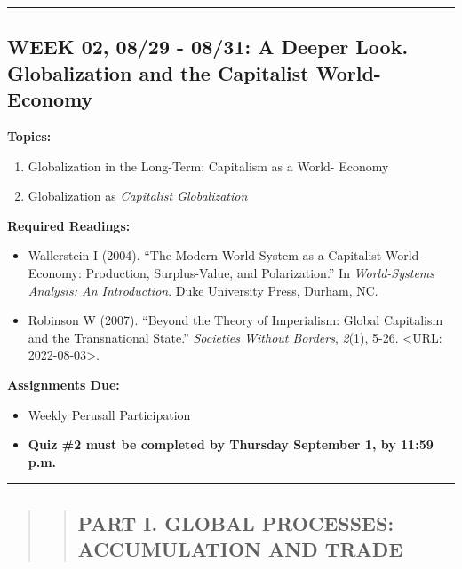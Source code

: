 \documentclass[11pt,]{article}
\providecommand{\tightlist}{%
  \setlength{\itemsep}{0pt}\setlength{\parskip}{0pt}}
\begin{document}
\bigbreak
\hrule
\newpage

\hypertarget{week-02-0829---0831-a-deeper-look.-globalization-and-the-capitalist-world-economy}{%
\subsection{WEEK 02, 08/29 - 08/31: A Deeper Look. Globalization and the
Capitalist
World-Economy}\label{week-02-0829---0831-a-deeper-look.-globalization-and-the-capitalist-world-economy}}

\textbf{Topics:}

\begin{enumerate}
\def\labelenumi{(\arabic{enumi})}
\tightlist
\item
  Globalization in the Long-Term: Capitalism as a World- Economy
\item
  Globalization as \emph{Capitalist Globalization}
\end{enumerate}

\textbf{Required Readings:}

\begin{itemize}
\item
  Wallerstein I (2004). ``The Modern World-System as a Capitalist World-
  Economy: Production, Surplus-Value, and Polarization.'' In
  \emph{World-Systems Analysis: An Introduction}. Duke University Press,
  Durham, NC.
\item
  Robinson W (2007). ``Beyond the Theory of Imperialism: Global
  Capitalism and the Transnational State.'' \emph{Societies Without
  Borders}, \emph{2}(1), 5-26. \textless URL: 2022-08-03\textgreater.
\end{itemize}

\textbf{Assignments Due:}

\begin{itemize}
\tightlist
\item
  Weekly Perusall Participation
\item
  \textbf{Quiz \#2 must be completed by Thursday September 1, by 11:59
  p.m.}
\end{itemize}

\bigbreak
\hrule

\begin{quote}
\begin{quote}
\hypertarget{part-i.-global-processes-accumulation-and-trade}{%
\subsection{PART I. GLOBAL PROCESSES: ACCUMULATION AND
TRADE}\label{part-i.-global-processes-accumulation-and-trade}}
\end{quote}
\end{quote}
\end{document}
